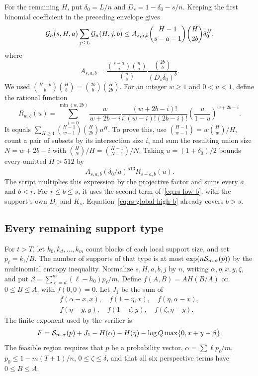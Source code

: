 For the remaining $H$, put $\delta_0=L/n$ and $D_s=1-\delta_0-s/n$.
Keeping the first binomial coefficient in the preceding envelope gives
\[
 \mathcal G_n(s,H,a)\sum_{j\le L}\mathcal G_n(H,j,b)
 \le A_{s,a,b}\binom{H-1}{s-a-1}\binom H{2b}\delta_0^H,
\]
where
\[
 A_{s,a,b}=
 \frac{\binom{s-a}a\binom na}{\binom ns}
 \frac{\binom{2b}b}{(D_s\delta_0)^b}.
\]
We used $\binom{H-b}b\binom Hb=\binom{2b}b\binom H{2b}$.
For an integer $w\ge1$ and $0<u<1$, define the rational function
\begin{equation}
 R_{w,b}(u)=
 \sum_{i=0}^{\min(w,2b)}
 \frac{w}{w+2b-i}
 \frac{(w+2b-i)!}{i!(w-i)!(2b-i)!}
 \left(\frac u{1-u}\right)^{w+2b-i}.
 \label{eq:rs-moment}
\end{equation}
It equals $\sum_{H\ge1}\binom{H-1}{w-1}\binom H{2b}u^H$.
To prove this, use $\binom{H-1}{w-1}=w\binom Hw/H$, count a pair of
subsets by its intersection size $i$, and sum the resulting union size
$N=w+2b-i$ with $\binom HN/H=\binom{H-1}{N-1}/N$.
Taking $u=(1+\delta_0)/2$ bounds every omitted $H>512$ by
\begin{equation}
 A_{s,a,b}(\delta_0/u)^{513}R_{s-a,b}(u).
 \label{eq:rs-H-tail}
\end{equation}
The script multiplies this expression by the projective factor and sums
every $a$ and $b<r$.  For $r\le b\le s$, it uses the second term
of~\eqref{eq:rs-low-b}, with the support's own $D_s$ and $K_s$.
Equation~\eqref{eq:rs-global-high-b} already covers $b>s$.

\subsection{Every remaining support type}

For $t>T$, let $k_0,k_d,\ldots,k_m$ count blocks of each local support size,
and set $p_\ell=k_\ell/B$.  The number of supports of that type is at most
$\exp(n\mathcal S_{m,\sigma}(p))$ by the multinomial entropy inequality.
Normalize $s,H,a,b,j$ by $n$, writing $\alpha,\eta,x,y,\zeta$, and put
$\beta=\sum_{\ell=d}^m(\ell-h_0)p_\ell/m$.  Define
$f(A,B)=AH(B/A)$ on $0\le B\le A$, with $f(0,0)=0$.
Let $J_1$ be the sum of
\[
\begin{gathered}
 f(\alpha-x,x),\quad f(1-\eta,x),\quad f(\eta,\alpha-x),\\
 f(\eta-y,y),\quad f(1-\zeta,y),\quad f(\zeta,\eta-y).
\end{gathered}
\]
The finite exponent used by the verifier is
\[
 F=\mathcal S_{m,\sigma}(p)+J_1-H(\alpha)-H(\eta)
       -\log Q\max\{0,x+y-\beta\}.
\]
The feasible region requires that $p$ be a probability vector,
$\alpha=\sum\ell p_\ell/m$, $p_0\le1-m(T+1)/n$, $0\le\zeta\le\delta$,
and that all six perspective terms have $0\le B\le A$.


